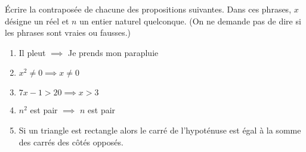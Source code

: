 \documentclass[11pt,class=report,crop=false]{standalone}
\begin{document}
\finexercice




\exercice{}
\enonce
Écrire la contraposée de chacune des propositions suivantes. 
Dans ces phrases, $x$ désigne un réel et $n$ un entier naturel quelconque.
(On ne demande pas de dire si les phrases sont vraies ou fausses.)
\begin{enumerate}
    \item Il pleut $\implies$ Je prends mon parapluie
    \item $x^2 \neq 0 \implies x \neq 0$ 
    \item $7x-1 > 20 \implies x > 3$ 
    \item $n^2$ est pair $\implies$ $n$ est pair 
    \item Si un triangle est rectangle alors le carré de l'hypoténuse est égal à la somme des carrés des côtés opposés.
\end{enumerate} 
\finenonce

\finexercice
\end{document}

